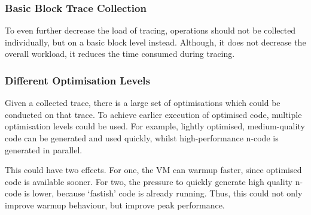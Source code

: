 \subsubsection{Basic Block Trace Collection} To even further decrease the load of
tracing, operations should not be collected individually, but on a basic block
level instead. Although, it does not decrease the overall workload, it reduces
the time consumed during tracing.

\subsubsection{Different Optimisation Levels}

Given a collected trace, there is a large set of optimisations which could be
conducted on that trace. To achieve earlier execution of
optimised code, multiple optimisation levels could be used. For example,
lightly optimised, medium-quality code can be generated and used quickly, whilst
high-performance n-code is generated in parallel.

This could have two effects. For one, the VM can warmup faster, since optimised
code is available sooner. For two, the pressure to quickly generate high quality
n-code is lower, because `fastish' code is already running. Thus, this could not
only improve warmup behaviour, but improve peak performance.


